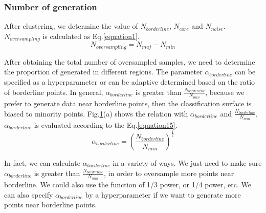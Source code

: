 \documentclass[runningheads]{llncs}
\begin{document}
\subsubsection{Number of generation}
After clustering, 
we determine the value of $N_{borderline}$, 
$N_{core}$ and $N_{noise}$. 
$N_{oversampling}$ is calculated as Eq.\ref{equation1}.
\begin{equation}
  \label{equation1}
  N_{oversampling}=N_{maj}-N_{min}
\end{equation}

After obtaining the total number of oversampled samples, 
we need to determine the proportion of generated 
in different regions.
The parameter $\alpha_{borderline}$ can be specified as a 
hyperparameter or can be adaptive determined based
 on the ratio of borderline points.
In general, $\alpha_{borderline}$ is greater than $\frac{N_{borderline}}{N_{min}}$,
because we prefer to generate data near borderline points,
then the classification surface is biased to minority points.
Fig.\ref{fig20}(a) shows the relation with $\alpha_{borderline}$ and $\frac{N_{borderline}}{N_{min}}$.
$\alpha_{borderline}$ is evaluated according to the Eq.\ref{equation15}.
\begin{equation}
  \label{equation15}
  \alpha_{borderline}=(\frac{N_{borderline}}{N_{min}})^{\frac{1}{2}}
\end{equation}

In fact, we can calculate $\alpha_{borderline}$ in a variety of ways. 
We just need to make sure $\alpha_{borderline}$ is greater 
than $\frac{N_{borderline}}{N_{min}}$, in order
to oversample more points near borderline. 
We could also use the function of 1/3 power, or 1/4 power, etc.
We can also specify $\alpha_{borderline}$ by a hyperparameter
if we want to generate more points near borderline points.
\begin{figure}[tb]
    \centering
    \quad
    \caption{}
    \label{fig20}
    \end{figure}
  
\end{document}
